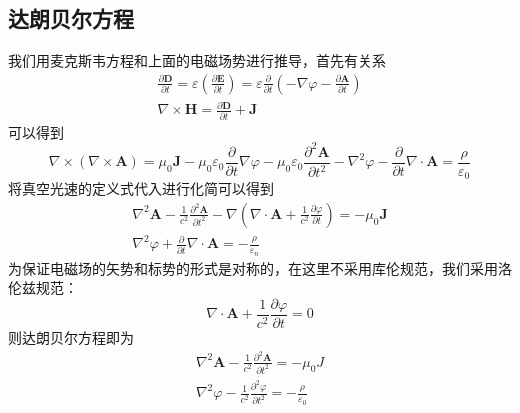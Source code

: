     \subsection{达朗贝尔方程}
        我们用麦克斯韦方程和上面的电磁场势进行推导，首先有关系
        \begin{equation*}
            \begin{gathered}
                \frac{\partial \boldsymbol{D}}{\partial t} = \varepsilon ( \frac{\partial \boldsymbol{E}}{\partial t}) = \varepsilon  \frac{\partial }{\partial t}(-\nabla \varphi -  \frac{\partial \boldsymbol{A}}{\partial t}) \\
                \nabla \times \boldsymbol{H} =  \frac{\partial \boldsymbol{D}}{\partial t} + \boldsymbol{J}
            \end{gathered}
        \end{equation*}
        可以得到
        \begin{equation}
            \nabla \times(\nabla \times \boldsymbol{A})= \mu_{0} \boldsymbol{J}-\mu_{0} \varepsilon_{0} \frac{\partial}{\partial t} \nabla \varphi-\mu_{0} \varepsilon_{0} \frac{\partial^{2} \boldsymbol{A}}{\partial t^{2}}-\nabla^{2} \varphi-\frac{\partial}{\partial t} \nabla \cdot \boldsymbol{A}=\frac{\rho}{\varepsilon_{0}}
        \end{equation}
        将真空光速的定义式代入进行化简可以得到
        \begin{equation}
            \begin{gathered}
            \nabla^{2} \boldsymbol{A}-\frac{1}{c^{2}} \frac{\partial^{2} \boldsymbol{A}}{\partial t^{2}}-\nabla\left(\nabla \cdot \boldsymbol{A}+\frac{1}{c^{2}} \frac{\partial \varphi}{\partial t}\right)=-\mu_{0} \boldsymbol{J} \\
            \nabla^{2} \varphi+\frac{\partial}{\partial t} \nabla \cdot \boldsymbol{A}=-\frac{\rho}{\varepsilon_{n}}
            \end{gathered}
        \end{equation}
        为保证电磁场的矢势和标势的形式是对称的，在这里不采用库伦规范，我们采用洛伦兹规范：
        \begin{equation}
            \nabla \cdot \boldsymbol{A} + \frac{1}{c^2} \frac{\partial \varphi}{\partial t}=0
        \end{equation}
        则达朗贝尔方程即为
        \begin{equation}
            \label{eq.5_7}
            \boxed{\begin{gathered}
            \nabla^{2} \boldsymbol{A}-\frac{1}{c^{2}} \frac{\partial^{2} \boldsymbol{A}}{\partial t^{2}}=-\mu_{0} J \\
            \nabla^{2} \varphi-\frac{1}{c^{2}} \frac{\partial^{2} \varphi}{\partial t^{2}}=-\frac{\rho}{\varepsilon_{0}} 
            \end{gathered}}
        \end{equation}
        
